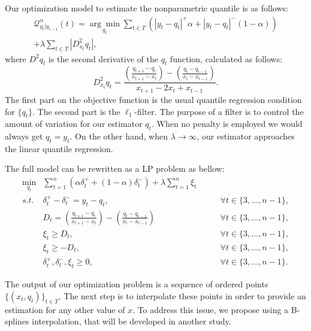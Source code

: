 Our optimization model to estimate the nonparametric quantile is as follows:
\begin{equation}
\begin{split}
\mathcal{Q}_{y_t|y_{t-1}}^\alpha(t) =\underset{q_{t}}{\arg\min}\sum_{t\in T}\left(|y_{t}-q_{t}|^{+}\alpha + |y_{t}-q_{t}|^{-}(1-\alpha)\right) \\ +\lambda  \sum_{t\in T}|D_{x_t}^{2}q_{t}|,
\end{split}
\end{equation}
where $D^2 q_t$ is the second derivative of the $q_t$ function, calculated as follows:
\begin{equation*}
D_{x_{t}}^{2}q_{t}=\frac{\left(\frac{q_{t+1}-q_{t}}{x_{t+1}-x_{t}}\right)-\left(\frac{q_{t}-q_{t-1}}{x_{t}-x_{t-1}}\right)}{x_{t+1}-2x_{t} + x_{t-1}}.
\end{equation*}
The first part on the objective function is the usual quantile regression condition for $\{q_t\}$. The second part is the $\ell_1$-filter. The purpose of a filter is to control the amount of variation for our estimator $q_t$. When no penalty is employed we would always get $q_t = y_t$. On the other hand, when $\lambda \rightarrow \infty$, our estimator approaches the linear quantile regression. 

The full model can be rewritten as a LP problem as bellow:
\begin{eqnarray}
\min_{q_{t}} & \sum_{t=1}^{n}\left(\alpha\delta_{t}^{+}+(1-\alpha)\delta_{t}^{-}\right)+\lambda\sum_{t=1}^{n}\xi_{t}\\
s.t. & \delta_{t}^{+}-\delta_{t}^{-}=y_{t}-q_{t}, & \qquad\forall t\in\{3,\dots,n-1\},\\
 & D_{t}=\left(\frac{q_{t+1}-q_{t}}{x_{t+1}-x_{t}}\right)-\left(\frac{q_{t}-q_{t-1}}{x_{t}-x_{t-1}}\right) & \qquad\forall t\in\{3,\dots,n-1\},\\
 & \xi_{t}\geq D_{t}, & \qquad\forall t\in\{3,\dots,n-1\},\\
 & \xi_{t}\geq-D_{t}, & \qquad\forall t\in\{3,\dots,n-1\},\\
 & \delta_{t}^{+},\delta_{t}^{-},\xi_{t}\geq0, & \qquad\forall t\in\{3,\dots,n-1\}.
\end{eqnarray}

The output of our optimization problem is a sequence of ordered points $\{(x_t, q_t)\}_{t \in T}$. The next step is to interpolate these points in order to provide an estimation for any other value of $x$. To address this issue, we propose using a B-splines interpolation, that will be developed in another study.

